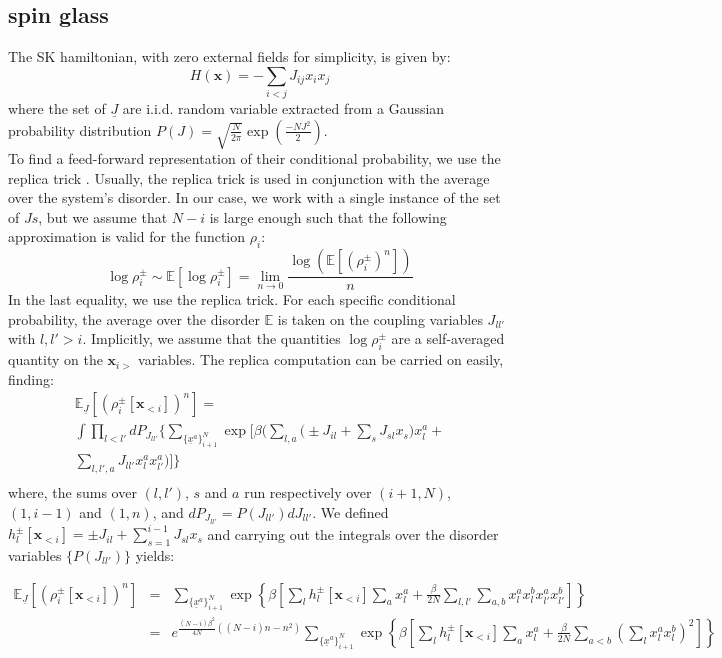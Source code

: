 \documentclass[aps,physrev,10pt,floatfix,longbibliography,nofootinbib,reprint]{revtex4-2}
\begin{document}
\subsection{spin glass}
The SK hamiltonian, with zero external fields for simplicity, is given by:
\begin{equation}
H\left(\mathbf{x}\right)=-\sum_{i<j}J_{ij}x_{i}x_{j}
\end{equation}
where the set of $\underline{J}$ are i.i.d. random variable extracted from a Gaussian probability distribution $P(J)=\sqrt{\frac{N}{2\pi}}\exp\left(\frac{-NJ^2}{2} \right)$. \\
To find a feed-forward representation of their conditional probability, we use the replica trick \cite{}. Usually, the replica trick is used in conjunction with the average over the system's disorder. In our case, we work with a single instance of the set of $Js$, but we assume that $N-i$ is large enough such that the following approximation is valid for the function $\rho_i$: 
\[
\log\rho_i^{\pm} \sim \mathbb{E}\left[  \log\rho_i^{\pm} \right] = \lim_{n\rightarrow 0} \frac{  \log(\mathbb{E}\left[(\rho_i^{\pm})^n \right])}{n}
\]
In the last equality, we use the replica trick. 
For each specific conditional probability, the average over the disorder $\mathbb{E}$ is taken on the coupling variables $J_{ll'}$ with $l,l'>i$. Implicitly, we assume that the quantities $\log\rho_i^{\pm}$ are a self-averaged quantity on the $\mathbf{x}_{i>}$ variables.
 The replica computation can be carried on easily, finding:
\begin{multline}
\mathbb{E}_{\underline{J}}\left[(\rho_i^{\pm}[\mathbf{x}_{<i}])^n \right]  = \\
\int \prod_{l<l'} dP_{J_{ll'}} \bigg\{ 
\sum_{\{\underline{x}^{a}\}_{i+1}^N} \exp\bigg[\beta \bigg(
\sum_{l,a}\bigg( \pm J_{il} + \sum_{s} J_{sl} x_s \bigg) x_l^{a} + \\
\sum_{l,l', a} J_{ll'} x_l^{a} x_{l'}^{a}
\bigg)  \bigg] 
\bigg\}\\
\end{multline}
where, the sums over $(l,l')$, $s$ and $a$ run respectively over $(i+1,N)$, $(1,i-1)$ and $(1,n)$, and $dP_{J_{ll'}}=P(J_{ll'})dJ_{ll'}$. We defined $h_l^{\pm}[\mathbf{x}_{<i}] =\pm J_{il} + \sum_{s=1}^{i-1} J_{sl} x_s$ and carrying out the integrals over the disorder variables $\{P(J_{ll'})\}$ yields:
\begin{widetext}
\begin{eqnarray}
\mathbb{E}_{\underline{J}}\left[(\rho_i^{\pm}[\mathbf{x}_{<i}])^n \right] & = & 
\sum_{\{\underline{x}^{a}\}_{i+1}^N} 
\exp\left\{\beta \left[
\sum_{l} h_l^{\pm}[\mathbf{x}_{<i}] \sum_{a} x_l^{a} +\frac{\beta}{2N} \sum_{l,l'} \sum_{a,b} x_l^{a} x_l^{b} x_{l'}^{a}x_{l'}^{b} \right]  \right\} \\
& = & e^{ \frac{(N-i) \beta^2}{4N}((N-i)n-n^2) } 
\sum_{\{\underline{x}^{a}\}_{i+1}^N} 
\exp\left\{\beta \left[
\sum_{l} h_l^{\pm}[\mathbf{x}_{<i}] \sum_{a} x_l^{a} +\frac{\beta}{2N} \sum_{a<b} \left( \sum_{l}  x_l^{a} x_l^{b} \right)^2 \right]  \right\}
\end{eqnarray}
\end{widetext}
\end{document}
